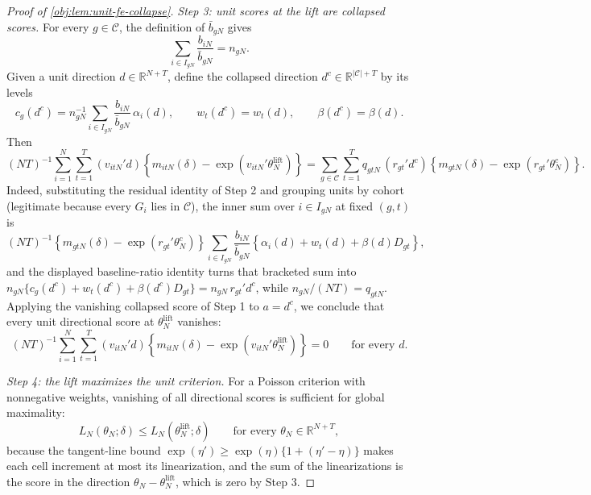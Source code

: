 \begin{proof}[Proof of \cref{obj:lem:unit-fe-collapse}]
\textit{Step 3: unit scores at the lift are collapsed scores.} For every \(g\in\mathcal C\), the definition of \(\bar b_{gN}\) gives
\[
\sum_{i\in I_{gN}}\frac{b_{iN}}{\bar b_{gN}}=n_{gN}.
\]
Given a unit direction \(d\in\mathbb R^{N+T}\), define the collapsed direction \(d^{c}\in\mathbb R^{|\mathcal C|+T}\) by its levels
\[
c_g(d^{c})=n_{gN}^{-1}\sum_{i\in I_{gN}}\frac{b_{iN}}{\bar b_{gN}}\,\alpha_i(d),
\qquad
w_t(d^{c})=w_t(d),
\qquad
\beta(d^{c})=\beta(d).
\]
Then
\[
(NT)^{-1}\sum_{i=1}^N\sum_{t=1}^T
(v_{itN}'d)\left\{m_{itN}(\delta)-\exp(v_{itN}'\theta_N^{\text{lift}})\right\}
=
\sum_{g\in\mathcal C}\sum_{t=1}^T
q_{gtN}\,(r_{gt}'d^{c})\left\{m_{gtN}(\delta)-\exp(r_{gt}'\theta_N^c)\right\}.
\]
Indeed, substituting the residual identity of Step 2 and grouping units by cohort (legitimate because every \(G_i\) lies in \(\mathcal C\)), the inner sum over \(i\in I_{gN}\) at fixed \((g,t)\) is
\[
(NT)^{-1}\left\{m_{gtN}(\delta)-\exp(r_{gt}'\theta_N^c)\right\}
\sum_{i\in I_{gN}}\frac{b_{iN}}{\bar b_{gN}}
\left\{\alpha_i(d)+w_t(d)+\beta(d)D_{gt}\right\},
\]
and the displayed baseline-ratio identity turns that bracketed sum into \(n_{gN}\{c_g(d^{c})+w_t(d^{c})+\beta(d^{c})D_{gt}\}=n_{gN}\,r_{gt}'d^{c}\), while \(n_{gN}/(NT)=q_{gtN}\).
Applying the vanishing collapsed score of Step 1 to \(a=d^{c}\), we conclude that every unit directional score at \(\theta_N^{\text{lift}}\) vanishes:
\[
(NT)^{-1}\sum_{i=1}^N\sum_{t=1}^T
(v_{itN}'d)\left\{m_{itN}(\delta)-\exp(v_{itN}'\theta_N^{\text{lift}})\right\}=0
\qquad\text{for every }d .
\]

\textit{Step 4: the lift maximizes the unit criterion.} For a Poisson criterion with nonnegative weights, vanishing of all directional scores is sufficient for global maximality:
\[
L_N(\theta_N;\delta)\le L_N(\theta_N^{\text{lift}};\delta)
\qquad\text{for every }\theta_N\in\mathbb R^{N+T},
\]
because the tangent-line bound \(\exp(\eta')\ge\exp(\eta)\{1+(\eta'-\eta)\}\) makes each cell increment at most its linearization, and the sum of the linearizations is the score in the direction \(\theta_N-\theta_N^{\text{lift}}\), which is zero by Step 3.


\end{proof}
